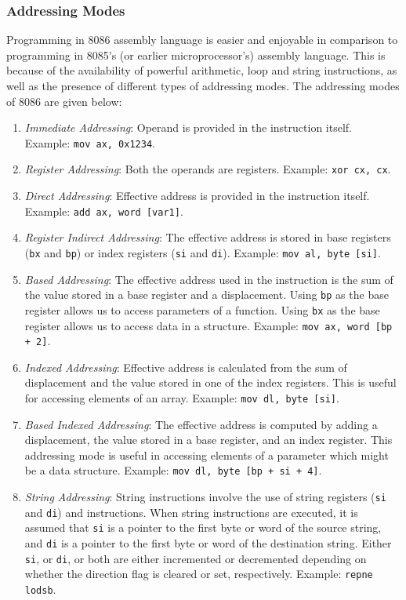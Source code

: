 \subsubsection{Addressing Modes}
Programming in 8086 assembly language is easier and enjoyable in comparison to programming in 8085's (or earlier microprocessor's) assembly language. This is because of the availability of powerful arithmetic, loop and string instructions, as well as the presence of different types of addressing modes. The addressing modes of 8086 are given below:
\begin{enumerate}
  \item \textit{Immediate Addressing}: Operand is provided in the instruction itself.\\Example: \verb|mov ax, 0x1234|.
  \item \textit{Register Addressing}: Both the operands are registers. Example: \verb|xor cx, cx|.
  \item \textit{Direct Addressing}: Effective address is provided in the instruction itself.\\Example: \verb|add ax, word [var1]|.
  \item \textit{Register Indirect Addressing}: The effective address is stored in base registers (\verb|bx| and \verb|bp|) or index registers (\verb|si| and \verb|di|). Example: \verb|mov al, byte [si]|. 
  \item \textit{Based Addressing}: The effective address used in the instruction is the sum of the value stored in a base register and a displacement. Using \verb|bp| as the base register allows us to access parameters of a function. Using \verb|bx| as the base register allows us to access data in a structure. Example: \verb|mov ax, word [bp + 2]|.
  \item \textit{Indexed Addressing}: Effective address is calculated from the sum of displacement and the value stored in one of the index registers. This is useful for accessing elements of an array. Example: \verb|mov dl, byte [si]|.
  \item \textit{Based Indexed Addressing}: The effective address is computed by adding a displacement, the value stored in a base register, and an index register. This addressing mode is useful in accessing elements of a parameter which might be a data structure. Example: \verb|mov dl, byte [bp + si + 4]|.
  \item \textit{String Addressing}: String instructions involve the use of string registers (\verb|si| and \verb|di|) and instructions. When string instructions are executed, it is assumed that \verb|si| is a pointer to the first byte or word of the source string, and \verb|di| is a pointer to the first byte or word of the destination string. Either \verb|si|, or \verb|di|, or both are either incremented or decremented depending on whether the direction flag is cleared or set, respectively. Example: \verb|repne lodsb|.

\end{enumerate}
